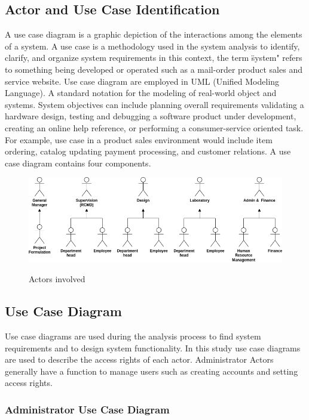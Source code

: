 \subsection{Actor and Use Case Identification}
A use case diagram is a graphic depiction of the interactions among the elements of a system. A use case is a methodology used in the system analysis to identify, clarify, and organize system requirements in this context, the term \"system" refers to something being developed or operated such as a mail-order product sales and service website. Use case diagram are employed in UML (Unified Modeling Language). A standard notation for the modeling of real-world object and systems. System objectives can include planning overall requirements validating a hardware design, testing and debugging a software product under development, creating an online help reference, or performing a consumer-service oriented task. For example, use case in a product sales environment would include item ordering, catalog updating payment processing, and customer relations. A use case diagram contains four components.

\begin{figure}[!h]
\includegraphics[width=13cm, keepaspectratio]{usecases/actors.png}
\label{shop_actors}
\caption{Actors involved }
\end{figure}

\subsection{Use Case Diagram}

Use case diagrams are used during the analysis
process to find system requirements and to design
system functionality. In this study use case
diagrams are used to describe the access rights of
each actor. Administrator Actors generally have a
function to manage users such as creating accounts
and setting access rights.

\subsubsection{Administrator Use Case Diagram}

